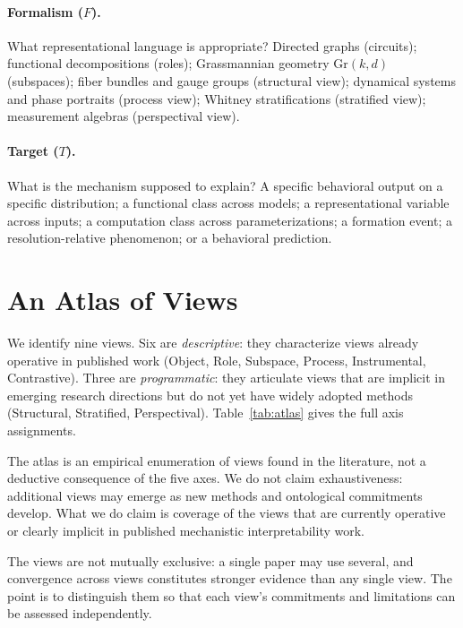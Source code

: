 \documentclass{article}
\newcommand{\Gr}{\mathrm{Gr}}
\begin{document}
\paragraph{Formalism ($F$).}
What representational language is appropriate?  Directed graphs (circuits);
functional decompositions (roles); Grassmannian geometry $\Gr(k,d)$
(subspaces); fiber bundles and gauge groups (structural view); dynamical
systems and phase portraits (process view); Whitney stratifications
(stratified view); measurement algebras (perspectival view).

\paragraph{Target ($T$).}
What is the mechanism supposed to explain?  A specific behavioral output
on a specific distribution; a functional class across models; a
representational variable across inputs; a computation class across
parameterizations; a formation event; a resolution-relative phenomenon;
or a behavioral prediction.

\section{An Atlas of Views}\label{sec:atlas}

We identify nine views.  Six are \emph{descriptive}: they characterize
views already operative in published work (Object, Role, Subspace,
Process, Instrumental, Contrastive).  Three are \emph{programmatic}:
they articulate views that are implicit in emerging research directions
but do not yet have widely adopted methods (Structural, Stratified,
Perspectival).
Table~\ref{tab:atlas} gives the full axis assignments.

The atlas is an empirical enumeration of views found in the literature, not a deductive consequence of the five axes.  We do not claim exhaustiveness: additional views may emerge as new methods and ontological commitments develop.  What we do claim is coverage of the views that are currently operative or clearly implicit in published mechanistic interpretability work.

The views are not mutually exclusive: a single paper may use several,
and convergence across views constitutes stronger evidence than any
single view.  The point is to distinguish them so that each view's
commitments and limitations can be assessed independently.
\end{document}
